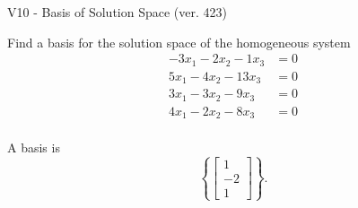 \begin{exercise}
  \begin{exerciseTitle}V10 - Basis of Solution Space (ver. 423)\end{exerciseTitle}
  \begin{exerciseStatement}
    Find a basis for the solution space of the homogeneous system 
\begin{align*}
 -3 x_ 1 -2 x_ 2 -1 x_ 3 &= 0  \\ 
  5 x_ 1 -4 x_ 2 -13 x_ 3 &= 0  \\ 
  3 x_ 1 -3 x_ 2 -9 x_ 3 &= 0  \\ 
  4 x_ 1 -2 x_ 2 -8 x_ 3 &= 0  \\ 
 \end{align*}


 
  \end{exerciseStatement}

  \begin{exerciseAnswer}
   A basis is   
\[\left\{\left[\begin{array}{c}
1 \\
-2 \\
1
\end{array}\right]\right\}.\]

  


  \end{exerciseAnswer}
\end{exercise}